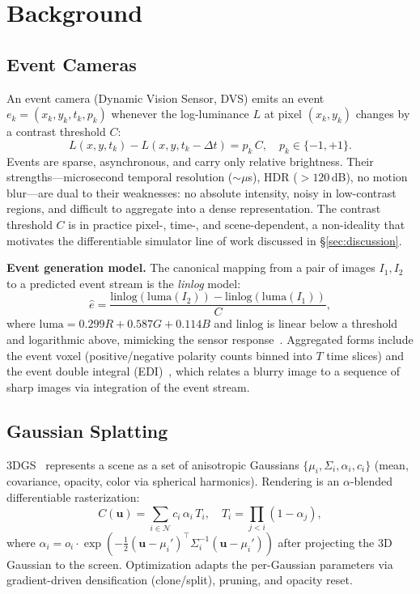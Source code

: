 \section{Background}
\label{sec:background}

\subsection{Event Cameras}
\label{sec:bg:event}

An event camera (Dynamic Vision Sensor, DVS) emits an event $e_k=(x_k,y_k,t_k,p_k)$ whenever the log-luminance $L$ at pixel $(x_k,y_k)$ changes by a contrast threshold $C$:
\begin{equation}
    L(x,y,t_k) - L(x,y,t_k-\Delta t) = p_k\, C, \quad p_k\in\{-1,+1\}.
    \label{eq:event}
\end{equation}
Events are sparse, asynchronous, and carry only relative brightness. Their strengths---microsecond temporal resolution ($\sim\!\mu$s), HDR ($>120$\,dB), no motion blur---are dual to their weaknesses: no absolute intensity, noisy in low-contrast regions, and difficult to aggregate into a dense representation. The contrast threshold $C$ is in practice pixel-, time-, and scene-dependent, a non-ideality that motivates the differentiable simulator line of work discussed in \S\ref{sec:discussion}.

\textbf{Event generation model.} The canonical mapping from a pair of images $I_1,I_2$ to a predicted event stream is the \emph{linlog} model:
\begin{equation}
    \hat{e} = \frac{\mathrm{linlog}(\mathrm{luma}(I_2)) - \mathrm{linlog}(\mathrm{luma}(I_1))}{C},
    \label{eq:linlog}
\end{equation}
where $\mathrm{luma}=0.299R+0.587G+0.114B$ and $\mathrm{linlog}$ is linear below a threshold and logarithmic above, mimicking the sensor response~\cite{bai2026erfgs}. Aggregated forms include the event voxel (positive/negative polarity counts binned into $T$ time slices) and the event double integral (EDI)~\cite{pan2019edi}, which relates a blurry image to a sequence of sharp images via integration of the event stream.

\subsection{Gaussian Splatting}
\label{sec:bg:gs}

3DGS~\cite{kerbl2023gaussian} represents a scene as a set of anisotropic Gaussians $\{\mu_i,\Sigma_i,\alpha_i,c_i\}$ (mean, covariance, opacity, color via spherical harmonics). Rendering is an $\alpha$-blended differentiable rasterization:
\begin{equation}
    C(\mathbf{u}) = \sum_{i\in\mathcal{N}} c_i\,\alpha_i\,T_i, \quad T_i=\prod_{j<i}(1-\alpha_j),
    \label{eq:splat}
\end{equation}
where $\alpha_i=o_i\cdot\exp(-\tfrac12(\mathbf{u}-\mu_i')^\top\Sigma_i^{-1}(\mathbf{u}-\mu_i'))$ after projecting the 3D Gaussian to the screen. Optimization adapts the per-Gaussian parameters via gradient-driven densification (clone/split), pruning, and opacity reset.


